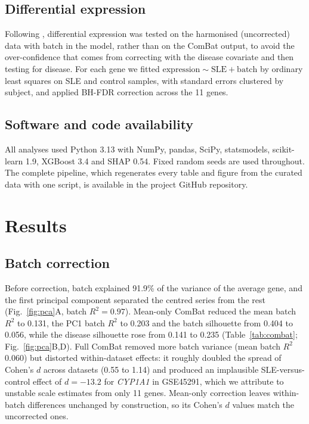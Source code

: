 \documentclass[11pt]{article}
\begin{document}
\subsection{Differential expression}

Following \citet{nygaard2016}, differential expression was tested on the harmonised (uncorrected) data with batch in the model, rather than on the ComBat output, to avoid the over-confidence that comes from correcting with the disease covariate and then testing for disease. For each gene we fitted $\text{expression} \sim \text{SLE} + \text{batch}$ by ordinary least squares on SLE and control samples, with standard errors clustered by subject, and applied BH-FDR correction across the 11 genes.

\subsection{Software and code availability}
All analyses used Python 3.13 with NumPy, pandas, SciPy, statsmodels, scikit-learn 1.9, XGBoost 3.4 and SHAP 0.54. Fixed random seeds are used throughout. The complete pipeline, which regenerates every table and figure from the curated data with one script, is available in the project GitHub repository.

\section{Results}

\subsection{Batch correction}

Before correction, batch explained 91.9\% of the variance of the average gene, and the first principal component separated the centred series from the rest (Fig.~\ref{fig:pca}A, batch $R^2 = 0.97$). Mean-only ComBat reduced the mean batch $R^2$ to 0.131, the PC1 batch $R^2$ to 0.203 and the batch silhouette from 0.404 to 0.056, while the disease silhouette rose from 0.141 to 0.235 (Table~\ref{tab:combat}; Fig.~\ref{fig:pca}B,D). Full ComBat removed more batch variance (mean batch $R^2$ 0.060) but distorted within-dataset effects: it roughly doubled the spread of Cohen's $d$ across datasets (0.55 to 1.14) and produced an implausible SLE-versus-control effect of $d = -13.2$ for \textit{CYP1A1} in GSE45291, which we attribute to unstable scale estimates from only 11 genes. Mean-only correction leaves within-batch differences unchanged by construction, so its Cohen's $d$ values match the uncorrected ones.
\end{document}
